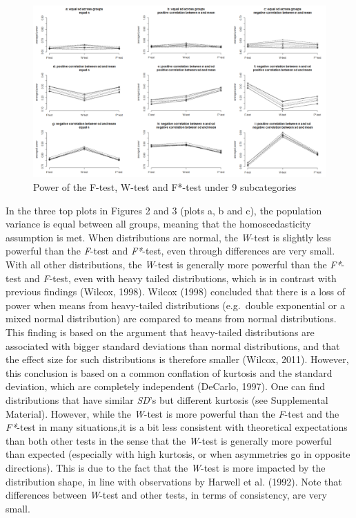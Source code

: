 \documentclass[man,floatsintext]{apa6}
\begin{document}
\begin{figure}
\includegraphics[width=1\linewidth]{Rmarkdown folder/Rmarkdown inputs/Fig3_after revision} \caption{Power of the F-test, W-test and F*-test under 9 subcategories}\label{fig:unnamed-chunk-3}
\end{figure}

In the three top plots in Figures 2 and 3 (plots a, b and c), the population variance is equal between all groups, meaning that the homoscedasticity assumption is met. When distributions are normal, the \emph{W}-test is slightly less powerful than the \emph{F}-test and \emph{F*}-test, even through differences are very small. With all other distributions, the \emph{W}-test is generally more powerful than the \emph{F*}-test and \emph{F}-test, even with heavy tailed distributions, which is in contrast with previous findings (Wilcox, 1998). Wilcox (1998) concluded that there is a loss of power when means from heavy-tailed distributions (e.g.~double exponential or a mixed normal distribution) are compared to means from normal distributions. This finding is based on the argument that heavy-tailed distributions are associated with bigger standard deviations than normal distributions, and that the effect size for such distributions is therefore smaller (Wilcox, 2011). However, this conclusion is based on a common conflation of kurtosis and the standard deviation, which are completely independent (DeCarlo, 1997). One can find distributions that have similar \emph{SD}'s but different kurtosis (see Supplemental Material). However, while the \emph{W}-test is more powerful than the \emph{F}-test and the \emph{F*}-test in many situations,it is a bit less consistent with theoretical expectations than both other tests in the sense that the \emph{W}-test is generally more powerful than expected (especially with high kurtosis, or when asymmetries go in opposite directions). This is due to the fact that the \emph{W}-test is more impacted by the distribution shape, in line with observations by Harwell et al. (1992). Note that differences between \emph{W}-test and other tests, in terms of consistency, are very small.
\end{document}
